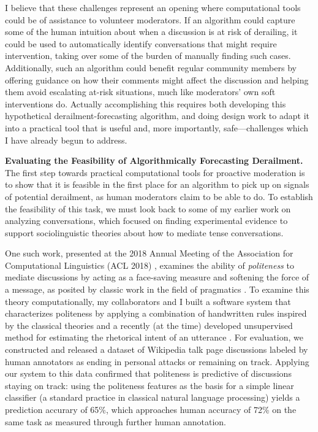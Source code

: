 \documentclass[11pt,letterpaper]{article}
\renewcommand{\section}[1]{\vspace{0.25\baselineskip}\noindent\textbf{#1.}}
\begin{document}
I believe that these challenges represent an opening where computational tools could be of assistance to volunteer moderators.
If an algorithm could capture some of the human intuition about when a discussion is at risk of derailing, it could be used to automatically identify conversations that might require intervention, taking over some of the burden of manually finding such cases.
Additionally, such an algorithm could benefit regular community members by offering guidance on how their comments might affect the discussion and helping them avoid escalating at-risk situations, much like moderators' own soft interventions do.
Actually accomplishing this requires both developing this hypothetical derailment-forecasting algorithm, and doing design work to adapt it into a practical tool that is useful and, more importantly, safe---challenges which I have already begun to address.

\section{Evaluating the Feasibility of Algorithmically Forecasting Derailment}
The first step towards practical computational tools for proactive moderation is to show that it is feasible in the first place for an algorithm to pick up on signals of potential derailment, as human moderators claim to be able to do.
To establish the feasibility of this task, we must look back to some of my earlier work on analyzing conversations, which focused on finding experimental evidence to support sociolinguistic theories about how to mediate tense conversations.

One such work, presented at the 2018 Annual Meeting of the Association for Computational Linguistics (ACL 2018) \cite{zhang_conversations_2018}, examines the ability of \emph{politeness} to mediate discussions by acting as a face-saving measure and softening the force of a message, as posited by classic work in the field of pragmatics \cite{clark_polite_1980-1,brown_politeness:_1987}.
To examine this theory computationally, my collaborators and I built a software system that characterizes politeness by applying a combination of handwritten rules inspired by the classical theories \cite{danescu-niculescu-mizil_computational_2013} and a recently (at the time) developed unsupervised method for estimating the rhetorical intent of an utterance \cite{zhang_asking_2017}.
For evaluation, we constructed and released a dataset of Wikipedia talk page discussions labeled by human annotators as ending in personal attacks or remaining on track.
Applying our system to this data confirmed that politeness is predictive of discussions staying on track: using the politeness features as the basis for a simple linear classifier (a standard practice in classical natural language processing) yields a prediction accurary of 65\%, which approaches human accuracy of 72\% on the same task as measured through further human annotation.
\end{document}
